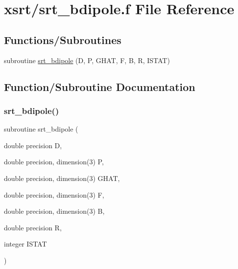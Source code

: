 \hypertarget{srt__bdipole_8f}{}\section{xsrt/srt\+\_\+bdipole.f File Reference}
\label{srt__bdipole_8f}
\subsection*{Functions/\+Subroutines}
\begin{DoxyCompactItemize}
\item 
subroutine \hyperlink{srt__bdipole_8f_a854cf0dcefa857084d326b30b1544f9a}{srt\+\_\+bdipole} (D, P, G\+H\+AT, F, B, R, I\+S\+T\+AT)
\end{DoxyCompactItemize}


\subsection{Function/\+Subroutine Documentation}
\mbox{\label{srt__bdipole_8f_a854cf0dcefa857084d326b30b1544f9a}} 
\subsubsection{\texorpdfstring{srt\+\_\+bdipole()}{srt\_bdipole()}}
{\footnotesize\ttfamily subroutine srt\+\_\+bdipole (\begin{DoxyParamCaption}\item[{double precision}]{D,  }\item[{double precision, dimension(3)}]{P,  }\item[{double precision, dimension(3)}]{G\+H\+AT,  }\item[{double precision, dimension(3)}]{F,  }\item[{double precision, dimension(3)}]{B,  }\item[{double precision}]{R,  }\item[{integer}]{I\+S\+T\+AT }\end{DoxyParamCaption})}

